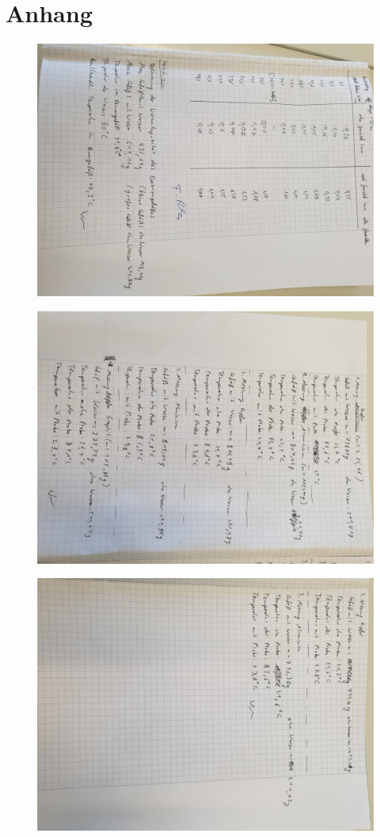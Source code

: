 \section{Anhang}

\begin{figure}[H]
    \centering
    \includegraphics[width=13cm]{1.jpg}
\end{figure}

\begin{figure}[H]
    \centering
    \includegraphics[width=13cm]{2.jpg}
\end{figure}

\begin{figure}[H]
    \centering
    \includegraphics[width=13cm]{3.jpg}
\end{figure}